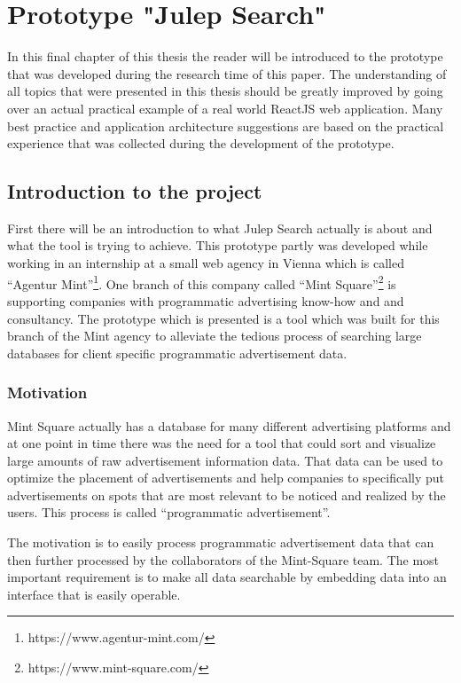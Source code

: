 \chapter{Prototype "Julep Search"}
\label{cha:prototypejulepsearch}

In this final chapter of this thesis the reader will be introduced to the prototype that was developed during the research time of this paper. The understanding of all topics that were presented in this thesis should be greatly improved by going over an actual practical example of a real world ReactJS web application. Many best practice and application architecture suggestions are based on the practical experience that was collected during the development of the prototype.

\section{Introduction to the project}

First there will be an introduction to what Julep Search actually is about and what the tool is trying to achieve. This prototype partly was developed while working in an internship at a small web agency in Vienna which is called \enquote{Agentur Mint}\footnote{https://www.agentur-mint.com/}. One branch of this company called \enquote{Mint Square}\footnote{https://www.mint-square.com/} is supporting companies with programmatic advertising know-how and and consultancy. The prototype which is presented is a tool which was built for this branch of the Mint agency to alleviate the tedious process of searching large databases for client specific programmatic advertisement data.

\subsection{Motivation}

Mint Square actually has a database for many different advertising platforms and at one point in time there was the need for a tool that could sort and visualize large amounts of raw advertisement information data. That data can be used to optimize the placement of advertisements and help companies to specifically put advertisements on spots that are most relevant to be noticed and realized by the users. This process is called \enquote{programmatic advertisement}.

The motivation is to easily process programmatic advertisement data  that can then further processed by the collaborators of the Mint-Square team. The most important requirement is to make all data searchable by embedding data into an interface that is easily operable.

